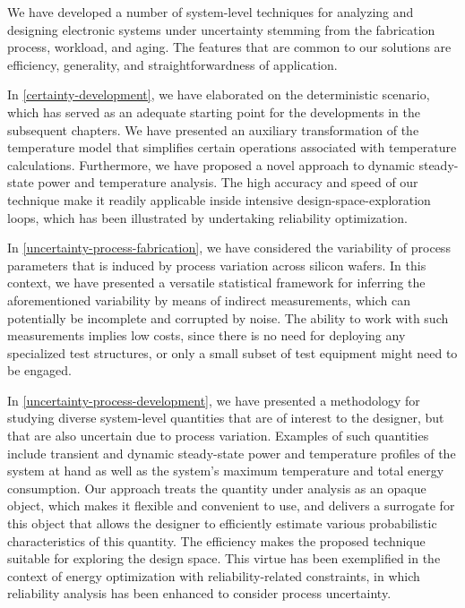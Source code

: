 We have developed a number of system-level techniques for analyzing and
designing electronic systems under uncertainty stemming from the fabrication
process, workload, and aging. The features that are common to our solutions are
efficiency, generality, and straightforwardness of application.

In \cref{certainty-development}, we have elaborated on the deterministic
scenario, which has served as an adequate starting point for the developments in
the subsequent chapters. We have presented an auxiliary transformation of the
temperature model that simplifies certain operations associated with temperature
calculations. Furthermore, we have proposed a novel approach to dynamic
steady-state power and temperature analysis. The high accuracy and speed of our
technique make it readily applicable inside intensive design-space-exploration
loops, which has been illustrated by undertaking reliability optimization.

In \cref{uncertainty-process-fabrication}, we have considered the variability of
process parameters that is induced by process variation across silicon wafers.
In this context, we have presented a versatile statistical framework for
inferring the aforementioned variability by means of indirect measurements,
which can potentially be incomplete and corrupted by noise. The ability to work
with such measurements implies low costs, since there is no need for deploying
any specialized test structures, or only a small subset of test equipment might
need to be engaged.

In \cref{uncertainty-process-development}, we have presented a methodology for
studying diverse system-level quantities that are of interest to the designer,
but that are also uncertain due to process variation. Examples of such
quantities include transient and dynamic steady-state power and temperature
profiles of the system at hand as well as the system's maximum temperature and
total energy consumption. Our approach treats the quantity under analysis as an
opaque object, which makes it flexible and convenient to use, and delivers a
surrogate for this object that allows the designer to efficiently estimate
various probabilistic characteristics of this quantity. The efficiency makes the
proposed technique suitable for exploring the design space. This virtue has been
exemplified in the context of energy optimization with reliability-related
constraints, in which reliability analysis has been enhanced to consider process
uncertainty.

